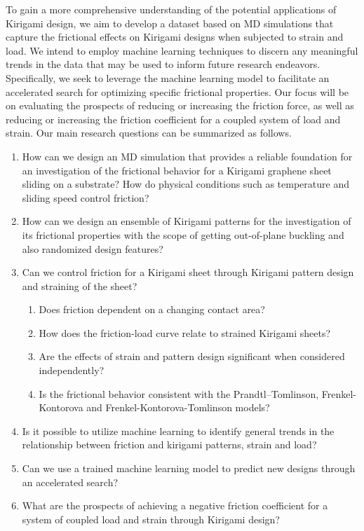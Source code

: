 To gain a more comprehensive understanding of the potential applications of Kirigami design, we aim to develop a dataset based on \acrshort{MD} simulations that capture the frictional effects on Kirigami designs when subjected to strain and load. We intend to employ machine learning techniques to discern any meaningful trends in the data that may be used to inform future research endeavors. Specifically, we seek to leverage the machine learning model to facilitate an accelerated search for optimizing specific frictional properties. Our focus will be on evaluating the prospects of reducing or increasing the friction force, as well as reducing or increasing the friction coefficient for a coupled system of load and strain. Our main research questions can be summarized as follows.


\begin{enumerate}
  \item  How can we design an \acrshort{MD} simulation that provides a reliable foundation for an investigation of the frictional behavior for a Kirigami graphene sheet sliding on a substrate? How do physical conditions such as temperature and sliding speed control friction?
  \item How can we design an ensemble of Kirigami patterns for the investigation of its frictional properties with the scope of getting out-of-plane buckling and also randomized design features?   
  \item Can we control friction for a Kirigami sheet through Kirigami pattern design and straining of the sheet?
  \begin{enumerate}
    \item Does friction dependent on a changing contact area?
    \item How does the friction-load curve relate to strained Kirigami sheets?
    \item Are the effects of strain and pattern design significant when considered independently?
    \item Is the frictional behavior consistent with the Prandtl–Tomlinson, Frenkel-Kontorova and Frenkel-Kontorova-Tomlinson models? 
  \end{enumerate}
  \item Is it possible to utilize machine learning to identify general trends in the relationship between friction and kirigami patterns, strain and load?
  \item Can we use a trained machine learning model to predict new designs through an accelerated search?
  \item What are the prospects of achieving a negative friction coefficient for a system of coupled load and strain through Kirigami design?
\end{enumerate}



